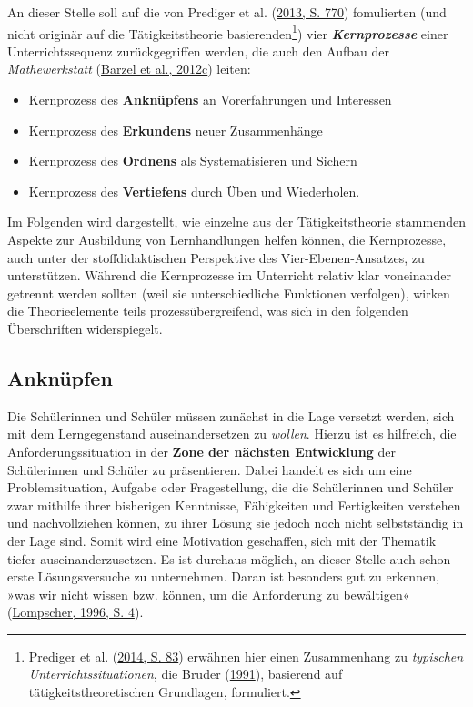 \documentclass[
]{scrbook}
\providecommand{\tightlist}{%
  \setlength{\itemsep}{0pt}\setlength{\parskip}{0pt}}
\theoremstyle{definition}
\theoremstyle{definition}
\theoremstyle{definition}
\theoremstyle{definition}
\theoremstyle{remark}
\begin{document}
An dieser Stelle soll auf die von Prediger et al. (\protect\hyperlink{ref-Prediger2013}{2013, S. 770}) fomulierten (und nicht originär auf die Tätigkeitstheorie basierenden\footnote{Prediger et al. (\protect\hyperlink{ref-Prediger2014}{2014, S. 83}) erwähnen hier einen Zusammenhang zu \emph{typischen Unterrichtssituationen}, die Bruder (\protect\hyperlink{ref-Bruder1991}{1991}), basierend auf tätigkeitstheoretischen Grundlagen, formuliert.}) vier \textbf{\emph{Kernprozesse}} einer Unterrichtssequenz zurückgegriffen werden, die auch den Aufbau der \emph{Mathewerkstatt} (\protect\hyperlink{ref-Barzel2012}{Barzel et al., 2012c}) leiten:

\begin{itemize}
\tightlist
\item
  Kernprozess des \textbf{Anknüpfens} an Vorerfahrungen und Interessen
\item
  Kernprozess des \textbf{Erkundens} neuer Zusammenhänge
\item
  Kernprozess des \textbf{Ordnens} als Systematisieren und Sichern
\item
  Kernprozess des \textbf{Vertiefens} durch Üben und Wiederholen.
\end{itemize}

Im Folgenden wird dargestellt, wie einzelne aus der Tätigkeitstheorie stammenden Aspekte zur Ausbildung von Lernhandlungen helfen können, die Kernprozesse, auch unter der stoffdidaktischen Perspektive des Vier-Ebenen-Ansatzes, zu unterstützen. Während die Kernprozesse im Unterricht relativ klar voneinander getrennt werden sollten (weil sie unterschiedliche Funktionen verfolgen), wirken die Theorieelemente teils prozessübergreifend, was sich in den folgenden Überschriften widerspiegelt.

\hypertarget{anknuepfen}{%
\subsection{Anknüpfen}\label{anknuepfen}}

Die Schülerinnen und Schüler müssen zunächst in die Lage versetzt werden, sich mit dem Lerngegenstand auseinandersetzen zu \emph{wollen}. Hierzu ist es hilfreich, die Anforderungssituation in der \textbf{Zone der nächsten Entwicklung} der Schülerinnen und Schüler zu präsentieren. Dabei handelt es sich um eine Problemsituation, Aufgabe oder Fragestellung, die die Schülerinnen und Schüler zwar mithilfe ihrer bisherigen Kenntnisse, Fähigkeiten und Fertigkeiten verstehen und nachvollziehen können, zu ihrer Lösung sie jedoch noch nicht selbstständig in der Lage sind. Somit wird eine Motivation geschaffen, sich mit der Thematik tiefer auseinanderzusetzen. Es ist durchaus möglich, an dieser Stelle auch schon erste Lösungsversuche zu unternehmen. Daran ist besonders gut zu erkennen, »was wir nicht wissen bzw. können, um die Anforderung zu bewältigen« (\protect\hyperlink{ref-Lompscher1996}{Lompscher, 1996, S. 4}).
\end{document}
